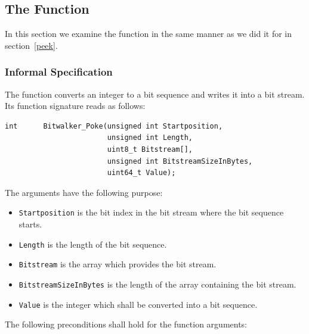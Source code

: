 \clearpage

\subsection{The Function \poke}
\label{poke}


In this section we examine the function \poke
in the same manner as we did it for \peek in section~\ref{peek}.

\subsubsection{Informal Specification}
\label{informal-poke}

The function \poke converts an integer to a bit sequence and writes it
into a bit stream.
Its function signature reads as follows:
\begin{lstlisting}[style = acsl-block]
int      Bitwalker_Poke(unsigned int Startposition,
                        unsigned int Length,
                        uint8_t Bitstream[],
                        unsigned int BitstreamSizeInBytes,
                        uint64_t Value);
\end{lstlisting}


The arguments have the following purpose:

\begin{itemize}
    \item \texttt{Startposition} is the bit index in the bit stream 
    where the bit sequence starts.
    \item \texttt{Length} is the length of the bit sequence.
    \item \texttt{Bitstream} is the array which provides the bit stream.
    \item \texttt{BitstreamSizeInBytes} is the length of the array 
    containing the bit stream. 
    \item \texttt{Value} is the integer which shall be converted into a bit sequence.
\end{itemize}


The following preconditions shall hold for the function arguments:

